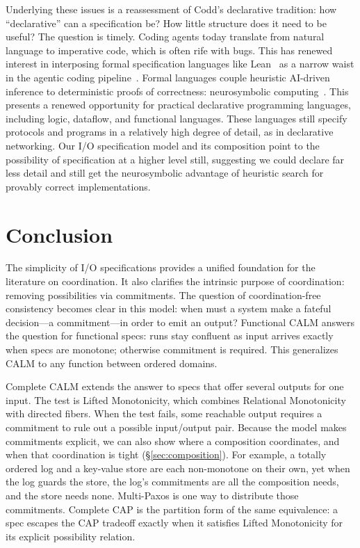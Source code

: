 \documentclass[sigconf]{cidr-2027}
\theoremstyle{remark}
\newcommand{\commitment}{commitment\xspace}
\newcommand{\commitments}{commitments\xspace}
\newcommand{\spectype}[1][]{I/O specification#1\xspace}
\begin{document}
Underlying these issues is a reassessment of Codd's declarative tradition: how
``declarative'' can a specification be? How little structure does it need to be
useful? \textcolor{reviewed}{The question is timely.} \textcolor{reviewed}{Coding agents today translate from natural
language to imperative code, which is often rife with bugs.} This has renewed
interest in interposing formal specification languages like
Lean~\cite{demoura2021lean4} as a narrow waist in the agentic coding pipeline~\cite{hellerstein2023codd}. Formal languages couple heuristic
AI-driven inference to deterministic proofs of correctness: neurosymbolic
computing~\cite{an2025neurosymbolic}. This presents a renewed
opportunity for practical declarative programming languages, including logic,
dataflow, and functional languages. These languages still specify protocols and
programs in a relatively high degree of detail, as in declarative networking. Our \spectype[] model and its composition point to the possibility of
specification at a higher level still, suggesting we could declare far less detail
and still get the neurosymbolic advantage of heuristic search for
provably correct implementations.

\section{Conclusion}
\label{sec:conclusion}

\textcolor{reviewed}{The simplicity of \spectype[s] provides a unified foundation for the
literature on coordination.} \textcolor{reviewed}{It also clarifies the intrinsic purpose of
coordination: removing possibilities via \commitments.} The question of
coordination-free consistency becomes clear in this model: when must a system
make a fateful decision---a \commitment---in order to emit an output? Functional CALM answers
the question for functional specs:  runs stay confluent as input arrives exactly
when specs are monotone; otherwise \commitment is required. This generalizes CALM to any function between ordered domains.

Complete CALM extends the answer to specs that offer several outputs
for one input. The test is Lifted Monotonicity, which combines Relational
Monotonicity with directed fibers. When the test fails, some reachable output
requires a \commitment to rule out a possible input/output pair. Because the model makes \commitments explicit, we can also show where a
composition coordinates, and when that coordination is tight (\S\ref{sec:composition}). For example, a totally ordered log
and a key-value store are each non-monotone on their own, yet when the log
guards the store, the log's \commitments are all the composition needs, and
the store needs none. Multi-Paxos is one way to distribute those
\commitments. Complete CAP is the partition form of the same equivalence: a spec escapes
the CAP tradeoff exactly when it satisfies Lifted Monotonicity for its explicit possibility relation.
\end{document}
